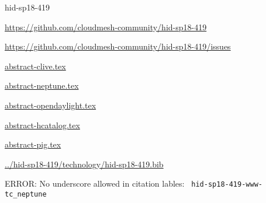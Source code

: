 \begin{IU}

hid-sp18-419

\url{https://github.com/cloudmesh-community/hid-sp18-419}

\url{https://github.com/cloudmesh-community/hid-sp18-419/issues}

\href{https://github.com/cloudmesh-community/hid-sp18-419/blob/master//technology/abstract-clive.tex}{abstract-clive.tex}

\href{https://github.com/cloudmesh-community/hid-sp18-419/blob/master//technology/abstract-neptune.tex}{abstract-neptune.tex}

\href{https://github.com/cloudmesh-community/hid-sp18-419/blob/master//technology/abstract-opendaylight.tex}{abstract-opendaylight.tex}

\href{https://github.com/cloudmesh-community/hid-sp18-419/blob/master//technology/abstract-hcatalog.tex}{abstract-hcatalog.tex}

\href{https://github.com/cloudmesh-community/hid-sp18-419/blob/master//technology/abstract-pig.tex}{abstract-pig.tex}

\href{https://github.com/cloudmesh-community/hid-sp18-419/blob/master//technology/hid-sp18-419.bib}{../hid-sp18-419/technology/hid-sp18-419.bib}

 ERROR: No underscore allowed in citation lables: \verb| hid-sp18-419-www-tc_neptune |

\end{IU}


